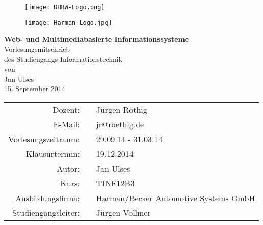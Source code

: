 \begin{titlepage}

  \onehalfspacing
  \begin{figure}[htbp]
    \begin{minipage}{0.4\textwidth}
     \centering
      \texttt{[image: DHBW-Logo.png]}
    \end{minipage}\hfill
    \begin{minipage}{0.4\textwidth}
     \centering
      \texttt{[image: Harman-Logo.jpg]}
    \end{minipage}
  \end{figure}

  \begin{center}	
	\vspace*{3,5cm}
    \huge
	\textbf{Web- und Multimediabasierte Informationssysteme\\}
	\vspace*{2cm}
    \Large Vorlesungsmitschrieb\\
    \normalsize des Studiengangs \Large Informationstechnik\\
    \vspace*{0,75cm}
    \normalsize von\\
    \Large Jan Ulses\\
    \vspace*{0,75cm}
    \large 15. September 2014\\
    \vspace*{1,8cm}
    \small
    \renewcommand{\arraystretch}{1,2}
    \singlespacing
    \begin{tabular}{rcl}
    	\hline
  		Dozent: & & Jürgen Röthig\\
  		E-Mail: & & jr@roethig.de\\
  		Vorlesungszeitraum: & \hspace*{0,5mm} & 29.09.14 - 31.03.14 \\
  		Klausurtermin: & & 19.12.2014\\
  		Autor: & & Jan Ulses\\
  		Kurs: & & TINF12B3\\
  		Ausbildungsfirma: & & Harman/Becker Automotive Systems GmbH\\
  		Studiengangsleiter: & & Jürgen Vollmer\\
  		\hline
 	\end{tabular}
    
  \end{center}
  \normalsize
  \vfill
  
\end{titlepage}
